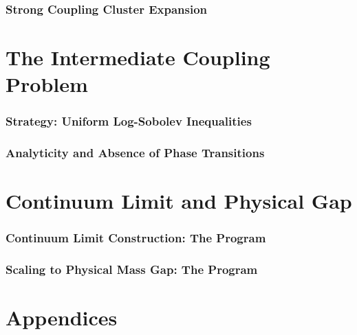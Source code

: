\documentclass[11pt,a4paper]{article}
\begin{document}
\section{Strong Coupling Cluster Expansion}



\part{The Intermediate Coupling Problem}
\label{part:intermediate}

\section{Strategy: Uniform Log-Sobolev Inequalities}


\section{Analyticity and Absence of Phase Transitions}



\part{Continuum Limit and Physical Gap}
\label{part:continuum}

\section{Continuum Limit Construction: The Program}


\section{Scaling to Physical Mass Gap: The Program}



\part{Appendices}
\appendix




\end{document}
